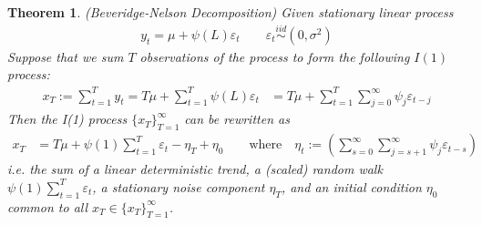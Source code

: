 \documentclass[12pt]{article}
\theoremstyle{plain}
\newtheorem{thm}{Theorem}[section]
\theoremstyle{definition}
\theoremstyle{remark}
\newcommand{\iid}{\overset{iid}{\sim}}
\newcommand{\sumtT}{\sum^T_{t=1}}
\begin{document}
\begin{thm}\emph{(Beveridge-Nelson Decomposition)}
\label{thm:beveridgenelson}
Given stationary linear process
\begin{align*}
  y_t = \mu+ \psi(L)\varepsilon_t
  \qquad \varepsilon_t \iid(0,\sigma^2)
\end{align*}
Suppose that we sum $T$ observations of the process to form the
following $I(1)$ process:
\begin{align*}
  x_T:=
  \sumtT y_t
  =
  T\mu
  +
  \sumtT
  \psi(L)\varepsilon_t
  &=
  T\mu
  +
  \sumtT
  \sum_{j=0}^{\infty}
  \psi_j \varepsilon_{t-j}
\end{align*}
Then the I(1) process $\{x_T\}_{T=1}^\infty$ can be rewritten as
\begin{align*}
  x_T
  &=
  T\mu
  +
  \psi(1)
  \sumtT \varepsilon_t
  -
  \eta_T
  +
  \eta_0
  \qquad \text{where}\quad
  \eta_t
  :=
  \left(
  \sum_{s=0}^\infty
  \sum_{j=s+1}^\infty \psi_j\varepsilon_{t-s}
  \right)
\end{align*}
i.e. the sum of a linear deterministic trend, a (scaled) random walk
$\psi(1)\sumtT \varepsilon_t$, a stationary noise component $\eta_T$,
and an initial condition $\eta_0$ common to all $x_T\in
\{x_T\}_{T=1}^\infty$.
\end{thm}
\end{document}
